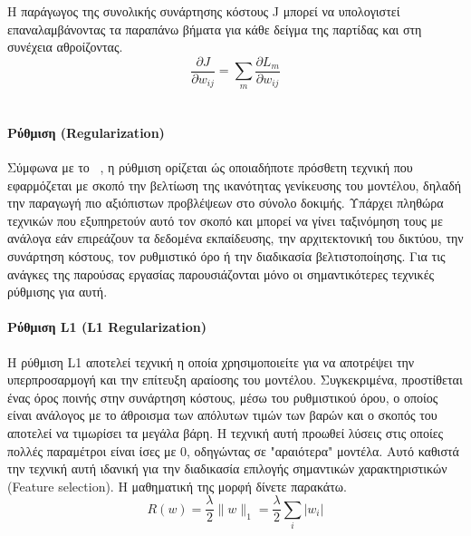 \documentclass[12pt]{article}
\numberwithin{equation}{section}
\begin{document}
\noindent Η παράγωγος της συνολικής συνάρτησης κόστους J μπορεί να υπολογιστεί επαναλαμβάνοντας τα παραπάνω βήματα για κάθε δείγμα της παρτίδας και στη συνέχεια αθροίζοντας. \\

\begin{equation}
\frac{\partial J}{\partial w_{ij}} = \sum_m \frac{\partial L_m}{\partial w_{ij}}
\end{equation}\\

\paragraph{Ρύθμιση (Regularization)\\ [0.5cm]}

Σύμφωνα με το ~\cite{kukačka2017regularizationdeeplearningtaxonomy}, η ρύθμιση ορίζεται ώς οποιαδήποτε πρόσθετη τεχνική που εφαρμόζεται με σκοπό την βελτίωση της ικανότητας γενίκευσης του μοντέλου, δηλαδή την παραγωγή πιο αξιόπιστων προβλέψεων στο σύνολο δοκιμής. Υπάρχει πληθώρα τεχνικών που εξυπηρετούν αυτό τον σκοπό και μπορεί να γίνει ταξινόμηση τους με ανάλογα εάν επιρεάζουν τα δεδομένα εκπαίδευσης, την αρχιτεκτονική του δικτύου, την συνάρτηση κόστους, τον ρυθμιστικό όρο ή την διαδικασία βελτιστοποίησης. Για τις ανάγκες της παρούσας εργασίας παρουσιάζονται μόνο οι σημαντικότερες τεχνικές ρύθμισης για αυτή. 

\paragraph{Ρύθμιση L1 (L1 Regularization) \\ [0.5 cm]} 
 
Η ρύθμιση L1 αποτελεί τεχνική η οποία χρησιμοποιείτε για να αποτρέψει την υπερπροσαρμογή και την επίτευξη αραίοσης του μοντέλου. Συγκεκριμένα, προστίθεται ένας όρος ποινής στην συνάρτηση κόστους, μέσω του ρυθμιστικού όρου, ο οποίος είναι ανάλογος με το άθροισμα των απόλυτων τιμών των βαρών και ο σκοπός του αποτελεί να τιμωρίσει τα μεγάλα βάρη. Η τεχνική αυτή προωθεί λύσεις στις οποίες πολλές παραμέτροι είναι ίσες με 0, οδηγώντας σε "αραιότερα" μοντέλα. Αυτό καθιστά την τεχνική αυτή ιδανική για την διαδικασία επιλογής σημαντικών χαρακτηριστικών (Feature selection). Η μαθηματική της μορφή δίνετε παρακάτω.\\

\begin{equation}
R(w) = \frac{\lambda}{2} \|w\|_1 = \frac{\lambda}{2} \sum_i |w_i|
\end{equation}\\
\end{document}
